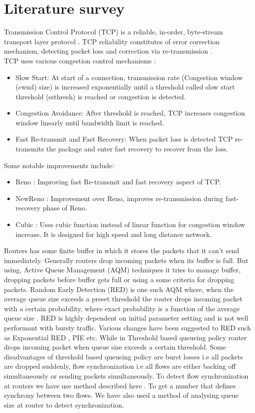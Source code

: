 \section{Literature survey}
Transmission Control Protocol (TCP) is a reliable, in-order, byte-stream transport layer protocol \cite{rfc9293}. TCP reliability constitutes of error correction mechanism, detecting packet loss and correction via re-transmission \cite{rfc9293}. \\
TCP uses various congestion control mechanisms \cite{rfc5681} :
\begin{itemize}
    \item Slow Start: At start of a connection, transmission rate (Congestion window (cwnd) size) is increased exponentially until a threshold called slow start threshold (ssthresh) is reached or congestion is detected.
    \item Congestion Avoidance: After threshold is reached, TCP increases congestion window linearly
until bandwidth limit is reached.
    \item Fast Re-transmit and Fast Recovery: When packet loss is detected TCP re-transmits the package
and enter fast recovery to recover from the loss.
\end{itemize}
Some notable improvements include:
\begin{itemize}
    \item Reno \cite{rfc5681}: Improving fast Re-transmit and fast recovery aspect of TCP.
    \item NewReno \cite{rfc6582}: Improvement over Reno, improves re-transmission during fast-recovery phase of Reno. 
    \item Cubic \cite{rfc9438}: Uses cubic function instead of linear function for congestion window increase. It is designed for high speed and long distance network.
\end{itemize}
Routers has some finite buffer in which it stores the packets that it can't send immediately. Generally routers drop incoming packets when its buffer is full. But using, Active Queue Management (AQM) techniques it tries to manage buffer, dropping packets before buffer gets full or using a some criteria for dropping packets\cite{bachl22}. Random Early Detection (RED) is one such AQM where, when the average queue size exceeds a preset threshold the router drops incoming packet with a certain probability, where exact probability is a function of the average queue size \cite{floyd93}. RED is highly dependent on initial parameter setting and is not well performant with bursty traffic. Various changes have been suggested to RED such as Exponential RED \cite{shao05}, PIE \cite{pan13} etc. While in Threshold based queueing policy router drops incoming packet when queue size exceeds a certain threshold. Some disadvantages of threshold based queueing policy are burst losses i.e all packets are dropped suddenly, flow synchronization i.e all flows are either backing off simultaneously or sending packets simultaneously. To detect flow synchronization at routers we have use method described here \cite{hass08}. To get a number that defines synchrony between two flows. We have also used a method of analysing queue size at router to detect synchronization. \\ 

